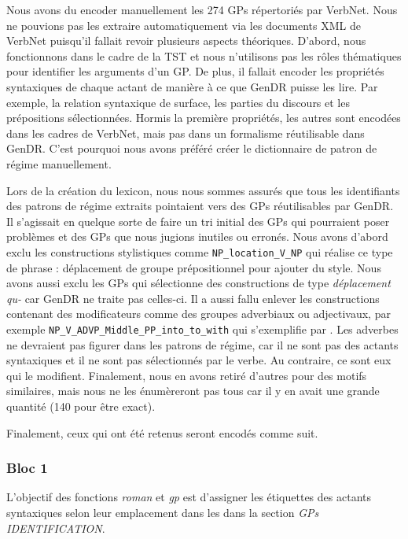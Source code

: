 Nous avons du encoder manuellement les 274 \acp{GP} répertoriés par VerbNet. Nous ne pouvions pas les extraire automatiquement via les documents XML de VerbNet puisqu'il fallait revoir plusieurs aspects théoriques. D'abord, nous fonctionnons dans le cadre de la \ac{TST} et nous n'utilisons pas les rôles thématiques pour identifier les arguments d'un \ac{GP}. De plus, il fallait encoder les propriétés syntaxiques de chaque actant de manière à ce que GenDR puisse les lire. Par exemple, la relation syntaxique de surface, les parties du discours et les prépositions sélectionnées. Hormis la première propriétés, les autres sont encodées dans les cadres de VerbNet, mais pas dans un formalisme réutilisable dans GenDR. C'est pourquoi nous avons préféré créer le dictionnaire de patron de régime manuellement.

Lors de la création du lexicon, nous nous sommes assurés que tous les identifiants des patrons de régime extraits pointaient vers des \acp{GP} réutilisables par GenDR. Il s'agissait en quelque sorte de faire un tri initial des \acp{GP} qui pourraient poser problèmes et des \acp{GP} que nous jugions inutiles ou erronés. Nous avons d'abord exclu les constructions stylistiques comme \lstinline|NP_location_V_NP| qui réalise ce type de phrase : déplacement de groupe prépositionnel pour ajouter du style. Nous avons aussi exclu les \acp{GP} qui sélectionne des constructions de type \emph{déplacement qu-} car GenDR ne traite pas celles-ci. Il a aussi fallu enlever les constructions contenant des modificateurs comme des groupes adverbiaux ou adjectivaux, par exemple \lstinline|NP_V_ADVP_Middle_PP_into_to_with| qui s'exemplifie par . Les adverbes ne devraient pas figurer dans les patrons de régime, car il ne sont pas des actants syntaxiques et il ne sont pas sélectionnés par le verbe. Au contraire, ce sont eux qui le modifient. Finalement, nous en avons retiré d'autres pour des motifs similaires, mais nous ne les énumèreront pas tous car il y en avait une grande quantité (140 pour être exact).

Finalement, ceux qui ont été retenus seront encodés comme suit.

\subsubsection{Bloc 1}
L'objectif des fonctions \emph{roman} et \emph{gp} est d'assigner les étiquettes des actants syntaxiques selon leur emplacement dans les dans la section \emph{GPs IDENTIFICATION}. 

